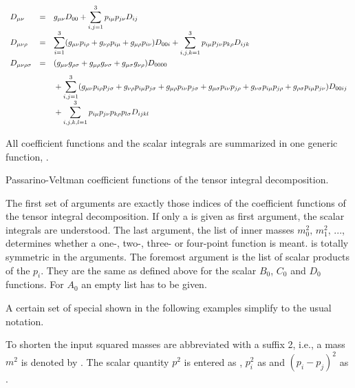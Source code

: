 \[\begin{array}{lll}
D_{\mu \nu } &=& g_{\mu \nu }D_{00}
+ \displaystyle\sum_{i,j=1}^{3} p_{i\mu} p_{j\nu }D_{ij} \\[1em]
D_{\mu \nu \rho } &=&
\displaystyle\sum_{i=1}^{3}(g_{\mu \nu }p_{i\rho }+g_{\nu \rho }p_{i\mu }
+ g_{\mu \rho }p_{i\nu }) D_{00i}
+ \sum_{i,j,k=1}^{3} p_{i\mu} p_{j\nu }p_{k\rho}D_{ijk} \\[1.4em]
D_{\mu \nu \rho \sigma } &=&
(g_{\mu\nu}g_{\rho \sigma} + g_{\mu\rho}g_{\nu \sigma }
+ g_{\mu\sigma}g_{\nu\rho }) D_{0000}\\ [.8em]
&&\mbox{}+\displaystyle\sum_{i,j=1}^{3}(g_{\mu \nu }p_{i\rho}p_{j\sigma}
+ g_{\nu \rho }p_{i\mu }p_{j\sigma} + g_{\mu \rho }p_{i\nu}p_{j\sigma}
+ g_{\mu \sigma}p_{i\nu}p_{j\rho }+ g_{\nu \sigma}p_{i\mu}p_{j\rho }
+ g_{\rho \sigma}p_{i\mu}p_{j\nu}) D_{00ij} \\[.8em]
&&\mbox{}+\displaystyle\sum_{i,j,k,l=1}^{3} p_{i\mu} p_{j\nu
}p_{k\rho}p_{l\sigma}D_{ijkl}
\end{array}
\]

All coefficient functions and the scalar integrals
are summarized in one generic function, .

 {Passarino-Veltman coefficient functions of the tensor integral decomposition.}

The first set of arguments  are exactly those
indices of the coefficient functions of the tensor integral decomposition.
If only a  is given as first argument, the scalar integrals are
understood. The last argument, the list of inner masses
$m_0^2,\, m_1^2,\, ...$, determines whether a one-, two-,
three- or four-point function is meant.
 is totally symmetric in the   arguments.
The foremost argument is the list of scalar products of the $p_i$.
They are the same as defined above for the scalar $B_0$, $C_0$ and
$D_0$ functions. For $A_0$ an empty list has to be given.

A certain set of special  shown in the following
examples simplify to the usual notation.

To shorten the input squared masses are abbreviated with a suffix 2,
i.e., a mass $m^2$ is denoted by .
The scalar quantity $p^2$ is entered as ,
$p_i^2$ as  and  $(p_i-p_j)^2$ as .


